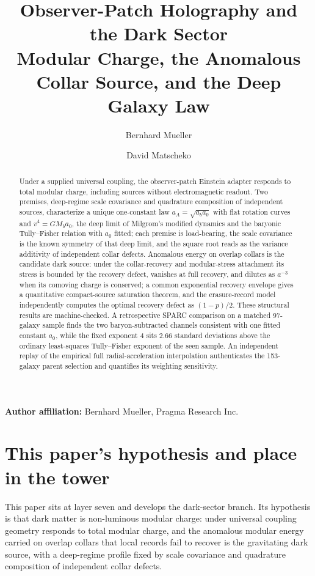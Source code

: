 \documentclass[11pt]{article}
\title{Observer-Patch Holography and the Dark Sector\\
\large Modular Charge, the Anomalous Collar Source, and the Deep Galaxy Law}
\author{Bernhard Mueller \and David Matscheko}
\date{\OPHPaperReleaseDate}
\begin{document}
\maketitle
\OPHPaperReleaseBanner

\begin{center}
\small\textbf{Author affiliation:} Bernhard Mueller, Pragma Research Inc.
\end{center}

\begin{abstract}
Under a supplied universal coupling, the observer-patch Einstein adapter
responds to total modular charge, including sources without electromagnetic
readout. Two premises, deep-regime scale covariance and quadrature
composition of independent sources, characterize a unique one-constant law
\(a_A=\sqrt{a_ba_0}\) with flat rotation curves and \(v^4=GM_ba_0\), the
deep limit of Milgrom's modified dynamics and the baryonic Tully--Fisher
relation with \(a_0\) fitted; each premise is load-bearing, the scale
covariance is the known symmetry of that deep limit, and the square root
reads as the variance additivity of independent collar defects. Anomalous energy on
overlap collars is the candidate dark source: under the collar-recovery and
modular-stress attachment its stress is bounded by the recovery defect,
vanishes at full recovery, and dilutes as \(a^{-3}\) when its comoving charge
is conserved; a common exponential recovery envelope gives a quantitative
compact-source saturation theorem, and the erasure-record model
independently computes the optimal recovery defect as \((1-p)/2\). These
structural results are machine-checked. A retrospective SPARC comparison on
a matched 97-galaxy sample finds the two baryon-subtracted channels
consistent with one fitted constant \(a_0\), while the fixed exponent \(4\)
sits \(2.66\) standard deviations above the ordinary least-squares
Tully--Fisher exponent of the seen sample. An independent replay of the
empirical full radial-acceleration interpolation authenticates the
153-galaxy parent selection and quantifies its weighting sensitivity.
\end{abstract}



\section*{This paper's hypothesis and place in the tower}

This paper sits at layer seven and develops the dark-sector branch. Its
hypothesis is that dark matter is non-luminous modular charge: under
universal coupling geometry responds to total modular charge, and the
anomalous modular energy carried on overlap collars that local records fail
to recover is the gravitating dark source, with a deep-regime profile fixed
by scale covariance and quadrature composition of independent collar
defects.
\end{document}
